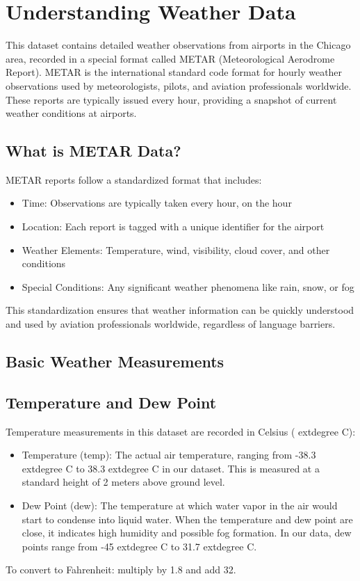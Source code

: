 \section{Understanding Weather Data}
This dataset contains detailed weather observations from airports in the Chicago area, recorded in a special format called METAR (Meteorological Aerodrome Report). METAR is the international standard code format for hourly weather observations used by meteorologists, pilots, and aviation professionals worldwide. These reports are typically issued every hour, providing a snapshot of current weather conditions at airports.
\subsection{What is METAR Data?}
METAR reports follow a standardized format that includes:\begin{itemize}
  \item Time: Observations are typically taken every hour, on the hour
  \item Location: Each report is tagged with a unique identifier for the airport
  \item Weather Elements: Temperature, wind, visibility, cloud cover, and other conditions
  \item Special Conditions: Any significant weather phenomena like rain, snow, or fog
\end{itemize}
This standardization ensures that weather information can be quickly understood and used by aviation professionals worldwide, regardless of language barriers.
\subsection{Basic Weather Measurements}
\subsection{Temperature and Dew Point}
Temperature measurements in this dataset are recorded in Celsius (	extdegree C):\begin{itemize}
  \item Temperature (temp): The actual air temperature, ranging from -38.3	extdegree C to 38.3	extdegree C in our dataset. This is measured at a standard height of 2 meters above ground level.
  \item Dew Point (dew): The temperature at which water vapor in the air would start to condense into liquid water. When the temperature and dew point are close, it indicates high humidity and possible fog formation. In our data, dew points range from -45	extdegree C to 31.7	extdegree C.
\end{itemize}
To convert to Fahrenheit: multiply by 1.8 and add 32.
